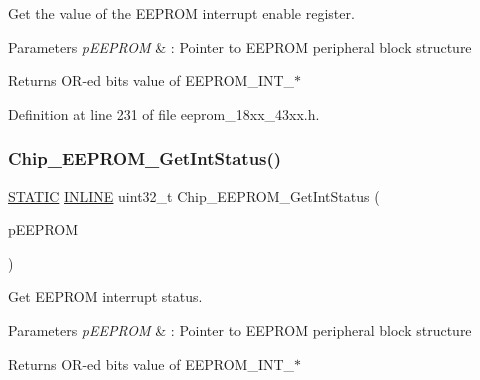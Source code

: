 Get the value of the E\+E\+P\+R\+OM interrupt enable register. 


\begin{DoxyParams}{Parameters}
{\em p\+E\+E\+P\+R\+OM} & \+: Pointer to E\+E\+P\+R\+OM peripheral block structure \\
\hline
\end{DoxyParams}
\begin{DoxyReturn}{Returns}
O\+R-\/ed bits value of E\+E\+P\+R\+O\+M\+\_\+\+I\+N\+T\+\_\+$\ast$ 
\end{DoxyReturn}


Definition at line 231 of file eeprom\+\_\+18xx\+\_\+43xx.\+h.

\mbox{\label{group___e_e_p_r_o_m__18_x_x__43_x_x_ga19e670ed83dcab5cc21237a3150ff082}} 
\subsubsection{\texorpdfstring{Chip\+\_\+\+E\+E\+P\+R\+O\+M\+\_\+\+Get\+Int\+Status()}{Chip\_EEPROM\_GetIntStatus()}}
{\footnotesize\ttfamily \hyperlink{group___l_p_c___types___public___macros_ga10b2d890d871e1489bb02b7e70d9bdfb}{S\+T\+A\+T\+IC} \hyperlink{spifi__18xx__43xx_8h_a2eb6f9e0395b47b8d5e3eeae4fe0c116}{I\+N\+L\+I\+NE} uint32\+\_\+t Chip\+\_\+\+E\+E\+P\+R\+O\+M\+\_\+\+Get\+Int\+Status (\begin{DoxyParamCaption}\item[{\hyperlink{struct_l_p_c___e_e_p_r_o_m___t}{L\+P\+C\+\_\+\+E\+E\+P\+R\+O\+M\+\_\+T} $\ast$}]{p\+E\+E\+P\+R\+OM }\end{DoxyParamCaption})}



Get E\+E\+P\+R\+OM interrupt status. 


\begin{DoxyParams}{Parameters}
{\em p\+E\+E\+P\+R\+OM} & \+: Pointer to E\+E\+P\+R\+OM peripheral block structure \\
\hline
\end{DoxyParams}
\begin{DoxyReturn}{Returns}
O\+R-\/ed bits value of E\+E\+P\+R\+O\+M\+\_\+\+I\+N\+T\+\_\+$\ast$ 
\end{DoxyReturn}


